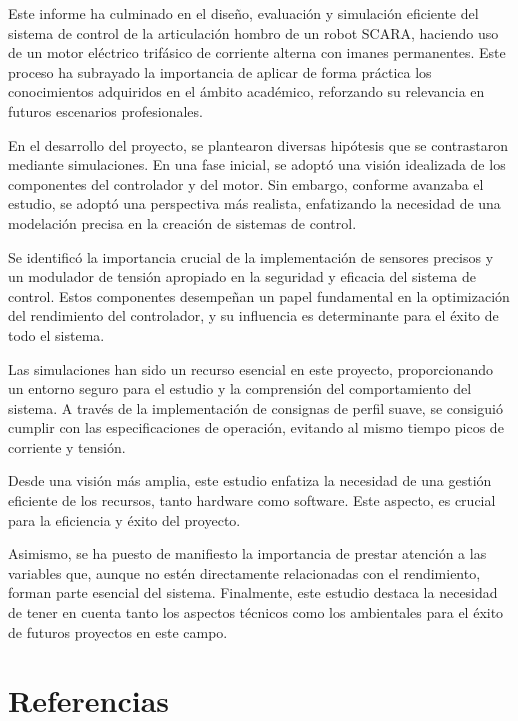 \documentclass{article}
\begin{document}
Este informe ha culminado en el diseño, evaluación y simulación eficiente del sistema de control de la 
articulación hombro de un robot SCARA, haciendo uso de un motor eléctrico trifásico de corriente alterna 
con imanes permanentes. Este proceso ha subrayado la importancia de aplicar de forma práctica los 
conocimientos adquiridos en el ámbito académico, reforzando su relevancia en futuros escenarios 
profesionales.

En el desarrollo del proyecto, se plantearon diversas hipótesis que se contrastaron mediante 
simulaciones. En una fase inicial, se adoptó una visión idealizada de los componentes del controlador 
y del motor. Sin embargo, conforme avanzaba el estudio, se adoptó una perspectiva más realista, 
enfatizando la necesidad de una modelación precisa en la creación de sistemas de control.

Se identificó la importancia crucial de la implementación de sensores precisos y un modulador de tensión 
apropiado en la seguridad y eficacia del sistema de control. Estos componentes desempeñan un papel 
fundamental en la optimización del rendimiento del controlador, y su influencia es determinante para 
el éxito de todo el sistema.

Las simulaciones han sido un recurso esencial en este proyecto, proporcionando un entorno seguro para el
estudio y la comprensión del comportamiento del sistema. A través de la implementación de consignas de 
perfil suave, se consiguió cumplir con las especificaciones de operación, evitando al mismo tiempo 
picos de corriente y tensión.

Desde una visión más amplia, este estudio enfatiza la necesidad de una gestión eficiente de los 
recursos, tanto hardware como software. Este aspecto, es crucial para la eficiencia y éxito del 
proyecto.

Asimismo, se ha puesto de manifiesto la importancia de prestar atención a las variables que, aunque 
no estén directamente relacionadas con el rendimiento, forman parte esencial del sistema. Finalmente, 
este estudio destaca la necesidad de tener en cuenta tanto los aspectos técnicos como los ambientales 
para el éxito de futuros proyectos en este campo.

\newpage

\part*{Referencias}
\end{document}
